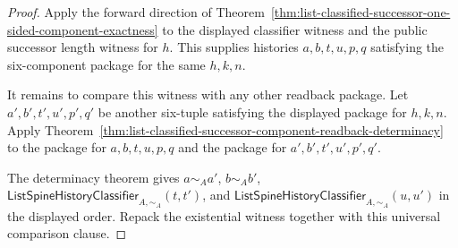 \begin{proof}
Apply the forward direction of
Theorem~\ref{thm:list-classified-successor-one-sided-component-exactness} to the
displayed classifier witness and the public successor length witness for $h$.
This supplies histories $a,b,t,u,p,q$ satisfying the six-component package for
the same $h,k,n$.

It remains to compare this witness with any other readback package. Let
$a',b',t',u',p',q'$ be another six-tuple satisfying the displayed package for
$h,k,n$. Apply
Theorem~\ref{thm:list-classified-successor-component-readback-determinacy} to
the package for $a,b,t,u,p,q$ and the package for
$a',b',t',u',p',q'$.

The determinacy theorem gives $a\sim_A a'$, $b\sim_A b'$,
$\mathsf{ListSpineHistoryClassifier}_{A,\sim_A}(t,t')$, and
$\mathsf{ListSpineHistoryClassifier}_{A,\sim_A}(u,u')$ in the displayed order.
Repack the existential witness together with this universal comparison clause.
\end{proof}
